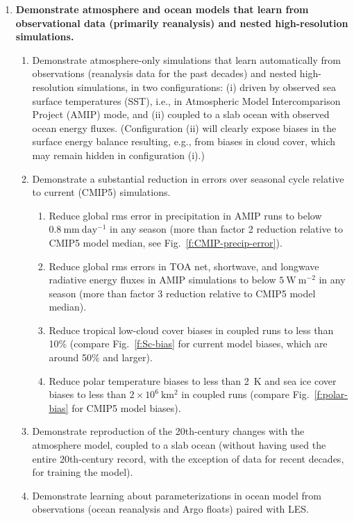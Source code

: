 \documentclass{article}
\begin{document}
\begin{enumerate}
    \item \textbf{Demonstrate atmosphere and ocean models that learn from observational data (primarily reanalysis) and nested high-resolution simulations.}
    \begin{enumerate}
        \item Demonstrate atmosphere-only simulations that learn automatically from observations (reanalysis data for the past decades) and nested high-resolution simulations, in two configurations: (i) driven by observed sea surface temperatures (SST), i.e., in Atmospheric Model Intercomparison Project (AMIP) mode, and (ii) coupled to a slab ocean with observed ocean energy fluxes. (Configuration (ii) will clearly expose biases in the surface energy balance resulting, e.g., from biases in cloud cover, which may remain hidden in configuration (i).)
        \item Demonstrate a substantial reduction in errors over seasonal cycle relative to current (CMIP5) simulations. 
        \begin{enumerate}
            \item Reduce global rms error in precipitation in AMIP runs to below $0.8~\mathrm{mm~day^{-1}}$ in any season (more than factor 2 reduction relative to CMIP5 model median, see Fig.~\ref{f:CMIP-precip-error}).
            \item Reduce global rms errors in TOA net, shortwave, and longwave radiative energy fluxes in AMIP simulations to below $5~\mathrm{W~m^{-2}}$ in any season (more than factor 3 reduction relative to CMIP5 model median).
            \item Reduce tropical low-cloud cover biases in coupled runs to less than 10\% (compare Fig.~\ref{f:Sc-bias} for current model biases, which are around 50\% and larger).
            \item Reduce polar temperature biases to less than 2~K and sea ice cover biases to less than $2\times 10^6~\mathrm{km^2}$ in coupled runs (compare Fig.~\ref{f:polar-bias} for CMIP5 model biases).
             \end{enumerate}
                \item Demonstrate reproduction of the 20th-century changes with the atmosphere model, coupled to a slab ocean (without having used the entire 20th-century record, with the exception of data for recent decades, for training the model).
        \item Demonstrate learning about parameterizations in ocean model from observations (ocean reanalysis and Argo floats) paired with LES.

\end{enumerate}
\end{enumerate}
\end{document}
